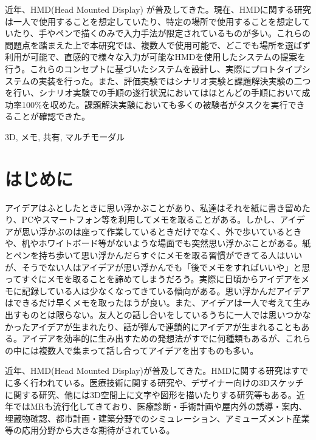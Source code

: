 \documentclass[technicalreport]{ieicej}
\begin{document}
\begin{jabstract}
近年、HMD(Head Mounted Display) が普及してきた。現在、HMDに関する研究は一人で使用することを想定していたり、特定の場所で使用することを想定していたり、手やペンで描くのみで入力手法が限定されているものが多い。これらの問題点を踏まえた上で本研究では、複数人で使用可能で、どこでも場所を選ばず利用が可能で、直感的で様々な入力が可能なHMDを使用したシステムの提案を行う。これらのコンセプトに基づいたシステムを設計し、実際にプロトタイプシステムの実装を行った。また、評価実験ではシナリオ実験と課題解決実験の二つを行い、シナリオ実験での手順の遂行状況においてはほとんどの手順において成功率100\%を収めた。課題解決実験においても多くの被験者がタスクを実行できることが確認できた。
\end{jabstract}
\begin{jkeyword}
3D, メモ, 共有, マルチモーダル
\end{jkeyword}
\maketitle

\section{はじめに}
アイデアはふとしたときに思い浮かぶことがあり、私達はそれを紙に書き留めたり、PCやスマートフォン等を利用してメモを取ることがある。しかし、アイデアが思い浮かぶのは座って作業しているときだけでなく、外で歩いているときや、机やホワイトボード等がないような場面でも突然思い浮かぶことがある。紙とペンを持ち歩いて思い浮かんだらすぐにメモを取る習慣ができてる人はいいが、そうでない人はアイデアが思い浮かんでも「後でメモをすればいいや」と思ってすぐにメモを取ることを諦めてしまうだろう。実際に日頃からアイデアをメモに記録している人は少なくなってきている傾向がある。思い浮かんだアイデアはできるだけ早くメモを取ったほうが良い。また、アイデアは一人で考えて生み出すものとは限らない。友人との話し合いをしているうちに一人では思いつかなかったアイデアが生まれたり、話が弾んで連鎖的にアイデアが生まれることもある。アイデアを効率的に生み出すための発想法がすでに何種類もあるが、これらの中には複数人で集まって話し合ってアイデアを出すものも多い。

近年、HMD(Head Mounted Display)が普及してきた。HMDに関する研究はすでに多く行われている。医療技術に関する研究や、デザイナー向けの3Dスケッチに関する研究、他には3D空間上に文字や図形を描いたりする研究等もある。近年ではMRも流行化してきており、医療診断・手術計画や屋内外の誘導・案内、埋蔵物確認、都市計画・建築分野でのシミュレーション、アミューズメント産業等の応用分野から大きな期待がされている。
\end{document}
